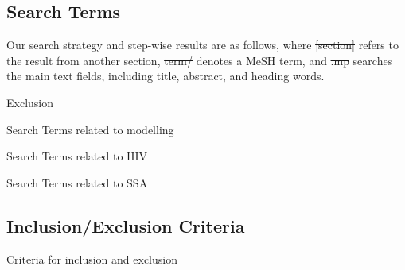 \subsection{Search Terms}
\label{aa:search:terms}
Our search strategy and step-wise results are as follows, where
\st{[section]} refers to the result from another section,
\st{term/} denotes a MeSH term, and
\st{.mp} searches the main text fields, including
title, abstract, and heading words.
\def\searchsize{\scriptsize}
\begin{table}[H]
  \caption{Exclusion}
  \centering
  
  \label{tab:search-exclude}
\end{table}
\begin{table}[H]
  \caption{Search Terms related to modelling}
  \centering
  
  \label{tab:search-model}
\end{table}
\begin{table}[H]
  \caption{Search Terms related to HIV}
  \centering
  
  \label{tab:search-hiv}
\end{table}
\begin{table}[H]
  \caption{Search Terms related to SSA}
  \centering
  
  \label{tab:search-ssa}
\end{table}
\subsection{Inclusion/Exclusion Criteria}
\label{aa:search:criteria}
\begin{table}[H]
  \caption{Criteria for inclusion and exclusion}
  \centering
  
  \label{tab:search-criteria}
\end{table}
